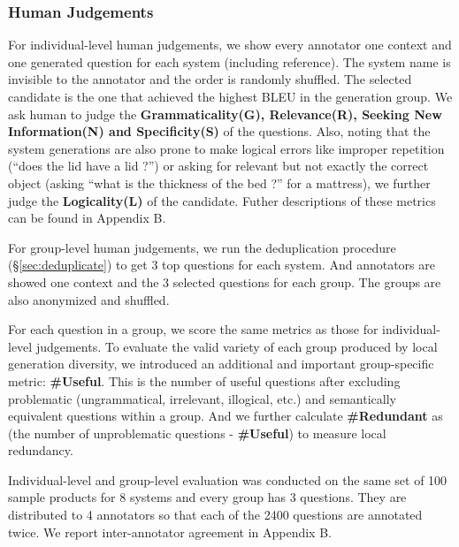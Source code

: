 \subsubsection{Human Judgements}
For individual-level human judgements, we show every annotator one context and one generated question for each system (including reference). The system name is invisible to the annotator and the order is randomly shuffled. The selected candidate is the one that achieved the highest BLEU in the generation group. 
We ask human to judge the \textbf{Grammaticality(G), Relevance(R), Seeking New Information(N) and Specificity(S)} of the questions. Also, noting that the system generations are also prone to make logical errors like improper repetition (``does the lid have a lid ?'') or asking for relevant but not exactly the correct object (asking ``what is the thickness of the bed ?'' for a mattress), we further judge the \textbf{Logicality(L)} of the candidate. Futher descriptions of these metrics can be found in Appendix B.

For group-level human judgements, we run the deduplication procedure (\S \ref{sec:deduplicate}) to get 3 top questions for each system. And annotators are showed one context and the 3 selected questions for each group. The groups are also anonymized and shuffled.

For each question in a group, we score the same metrics as those for individual-level judgements. To evaluate the valid variety of each group produced by local generation diversity, we introduced an additional and important group-specific metric: \textbf{\#Useful}. This is the number of useful questions after excluding problematic (ungrammatical, irrelevant, illogical, etc.) and semantically equivalent questions within a group. And we further calculate \textbf{\#Redundant} as (the number of unproblematic questions - \textbf{\#Useful}) to measure local redundancy.

Individual-level and group-level evaluation was conducted on the same set of 100 sample products for 8 systems and every group has 3 questions. They are distributed to 4 annotators so that each of the 2400 questions are annotated twice. We report inter-annotator agreement in Appendix B.

